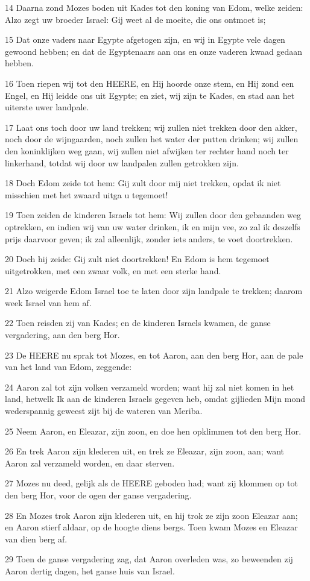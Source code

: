 \par 14 Daarna zond Mozes boden uit Kades tot den koning van Edom, welke zeiden: Alzo zegt uw broeder Israel: Gij weet al de moeite, die ons ontmoet is;
\par 15 Dat onze vaders naar Egypte afgetogen zijn, en wij in Egypte vele dagen gewoond hebben; en dat de Egyptenaars aan ons en onze vaderen kwaad gedaan hebben.
\par 16 Toen riepen wij tot den HEERE, en Hij hoorde onze stem, en Hij zond een Engel, en Hij leidde ons uit Egypte; en ziet, wij zijn te Kades, en stad aan het uiterste uwer landpale.
\par 17 Laat ons toch door uw land trekken; wij zullen niet trekken door den akker, noch door de wijngaarden, noch zullen het water der putten drinken; wij zullen den koninklijken weg gaan, wij zullen niet afwijken ter rechter hand noch ter linkerhand, totdat wij door uw landpalen zullen getrokken zijn.
\par 18 Doch Edom zeide tot hem: Gij zult door mij niet trekken, opdat ik niet misschien met het zwaard uitga u tegemoet!
\par 19 Toen zeiden de kinderen Israels tot hem: Wij zullen door den gebaanden weg optrekken, en indien wij van uw water drinken, ik en mijn vee, zo zal ik deszelfs prijs daarvoor geven; ik zal alleenlijk, zonder iets anders, te voet doortrekken.
\par 20 Doch hij zeide: Gij zult niet doortrekken! En Edom is hem tegemoet uitgetrokken, met een zwaar volk, en met een sterke hand.
\par 21 Alzo weigerde Edom Israel toe te laten door zijn landpale te trekken; daarom week Israel van hem af.
\par 22 Toen reisden zij van Kades; en de kinderen Israels kwamen, de ganse vergadering, aan den berg Hor.
\par 23 De HEERE nu sprak tot Mozes, en tot Aaron, aan den berg Hor, aan de pale van het land van Edom, zeggende:
\par 24 Aaron zal tot zijn volken verzameld worden; want hij zal niet komen in het land, hetwelk Ik aan de kinderen Israels gegeven heb, omdat gijlieden Mijn mond wederspannig geweest zijt bij de wateren van Meriba.
\par 25 Neem Aaron, en Eleazar, zijn zoon, en doe hen opklimmen tot den berg Hor.
\par 26 En trek Aaron zijn klederen uit, en trek ze Eleazar, zijn zoon, aan; want Aaron zal verzameld worden, en daar sterven.
\par 27 Mozes nu deed, gelijk als de HEERE geboden had; want zij klommen op tot den berg Hor, voor de ogen der ganse vergadering.
\par 28 En Mozes trok Aaron zijn klederen uit, en hij trok ze zijn zoon Eleazar aan; en Aaron stierf aldaar, op de hoogte diens bergs. Toen kwam Mozes en Eleazar van dien berg af.
\par 29 Toen de ganse vergadering zag, dat Aaron overleden was, zo beweenden zij Aaron dertig dagen, het ganse huis van Israel.

